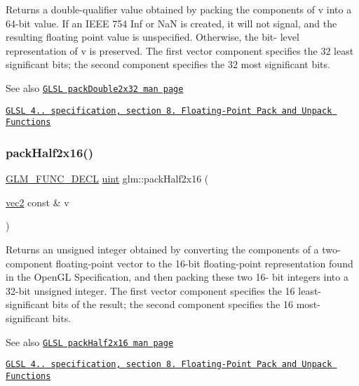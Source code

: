Returns a double-\/qualifier value obtained by packing the components of v into a 64-\/bit value. If an I\+E\+EE 754 Inf or NaN is created, it will not signal, and the resulting floating point value is unspecified. Otherwise, the bit-\/ level representation of v is preserved. The first vector component specifies the 32 least significant bits; the second component specifies the 32 most significant bits.

\begin{DoxySeeAlso}{See also}
\href{http://www.opengl.org/sdk/docs/manglsl/xhtml/packDouble2x32.xml}{\tt G\+L\+SL pack\+Double2x32 man page} 

\href{http://www.opengl.org/registry/doc/GLSLangSpec.4.20.8.pdf}{\tt G\+L\+SL 4.. specification, section 8. Floating-\/\+Point Pack and Unpack Functions} 
\end{DoxySeeAlso}
\mbox{\label{group__core__func__packing_ga20f134b07db3a3d3a38efb2617388c92}} 
\subsubsection{\texorpdfstring{pack\+Half2x16()}{packHalf2x16()}}
{\footnotesize\ttfamily \hyperlink{setup_8hpp_ab2d052de21a70539923e9bcbf6e83a51}{G\+L\+M\+\_\+\+F\+U\+N\+C\+\_\+\+D\+E\+CL} \hyperlink{group__core__precision_ga4fd29415871152bfb5abd588334147c8}{uint} glm\+::pack\+Half2x16 (\begin{DoxyParamCaption}\item[{\hyperlink{group__core__types_gaa1618f51db67eaa145db101d8c8431d8}{vec2} const \&}]{v }\end{DoxyParamCaption})}

Returns an unsigned integer obtained by converting the components of a two-\/component floating-\/point vector to the 16-\/bit floating-\/point representation found in the Open\+GL Specification, and then packing these two 16-\/ bit integers into a 32-\/bit unsigned integer. The first vector component specifies the 16 least-\/significant bits of the result; the second component specifies the 16 most-\/significant bits.

\begin{DoxySeeAlso}{See also}
\href{http://www.opengl.org/sdk/docs/manglsl/xhtml/packHalf2x16.xml}{\tt G\+L\+SL pack\+Half2x16 man page} 

\href{http://www.opengl.org/registry/doc/GLSLangSpec.4.20.8.pdf}{\tt G\+L\+SL 4.. specification, section 8. Floating-\/\+Point Pack and Unpack Functions} 
\end{DoxySeeAlso}
\mbox{\label{group__core__func__packing_ga977ab172da5494e5ac63e952afacfbe2}} 
